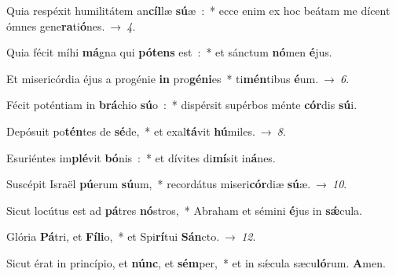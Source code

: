 ﻿\item Quia respéxit humilitátem an\textbf{cíl}\-læ \textbf{sú}\-æ~:~* ecce enim ex hoc beátam me dícent ómnes gene\textbf{ra}ti\textbf{ó}nes.~→~\emph{4}.
\item Quia fécit míhi \textbf{má}\-gna qui \textbf{pó}\-\textbf{tens} est~:~* et sánctum \textbf{nó}\-men \textbf{é}jus.
\item Et misericórdia éjus a progénie \textbf{in} pro\textbf{gé}\-\textbf{ni}\-es~* ti\textbf{mén}\-tibus \textbf{é}um.~→~\emph{6}.
\item Fécit poténtiam in \textbf{brá}\-chio \textbf{sú}\-o~:~* dispérsit supérbos ménte \textbf{cór}\-dis \textbf{sú}i.
\item Depósuit po\textbf{tén}\-tes de \textbf{sé}\-de,~* et exal\textbf{tá}\-vit \textbf{hú}miles.~→~\emph{8}.
\item Esuriéntes im\textbf{plé}\-vit \textbf{bó}\-nis~:~* et dívites di\textbf{mí}\-sit in\textbf{á}nes.
\item Suscépit Israël \textbf{pú}\-erum \textbf{sú}\-um,~* recordátus miseri\textbf{cór}\-diæ \textbf{sú}æ.~→~\emph{10}.
\item Sicut locútus est ad \textbf{pá}\-tres \textbf{nó}\-stros,~* Abraham et sémini \textbf{é}\-jus in \textbf{sǽ}cula.
\item Glória \textbf{Pá}\-tri, et \textbf{Fí}\-\textbf{li}\-o,~* et Spi\textbf{rí}\-tui \textbf{Sán}cto.~→~\emph{12}.
\item Sicut érat in princípio, et \textbf{núnc}, et \textbf{sém}\-per,~* et in sǽcula sæcu\textbf{ló}\-rum. \textbf{A}men.